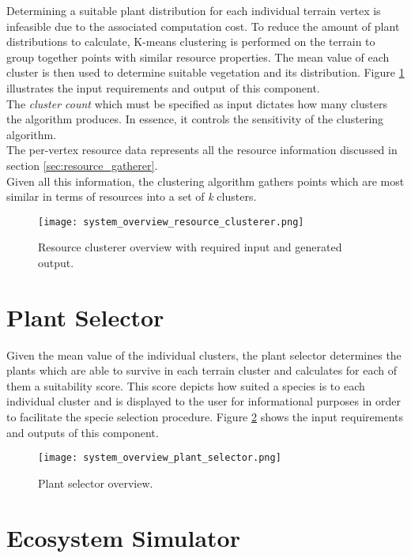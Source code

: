 Determining a suitable plant distribution for each individual terrain vertex is infeasible due to the associated computation cost. To reduce the amount of plant distributions to calculate, K-means clustering is performed on the terrain to group together points with similar resource properties. The mean value of each cluster is then used to determine suitable vegetation and its distribution. Figure \ref{fig:system_overview_resoure_clusterer} illustrates the input requirements and output of this component.\\
The \textit{cluster count} which must be specified as input dictates how many clusters the algorithm produces. In essence, it controls the sensitivity of the clustering algorithm.\\
The per-vertex resource data represents all the resource information discussed in section \ref{sec:resource_gatherer}.\\
Given all this information, the clustering algorithm gathers points which are most similar in terms of resources into a set of \textit{k} clusters. \\

\begin{figure}
\center
	\texttt{[image: system\_overview\_resource\_clusterer.png]}
	\caption{ Resource clusterer overview with required input and generated output.}	
	\label{fig:system_overview_resoure_clusterer}
\end{figure}

\section{Plant Selector}

Given the mean value of the individual clusters, the plant selector determines the plants which are able to survive in each terrain cluster and calculates for each of them a suitability score. This score depicts how suited a species is to each individual cluster and is displayed to the user for informational purposes in order to facilitate the specie selection procedure. Figure \ref{fig:system_overview_plant_selector} shows the input requirements and outputs of this component.

\begin{figure}
\center
	\texttt{[image: system\_overview\_plant\_selector.png]}
	\caption{ Plant selector overview.}	
	\label{fig:system_overview_plant_selector}
\end{figure}

\section{Ecosystem Simulator}

